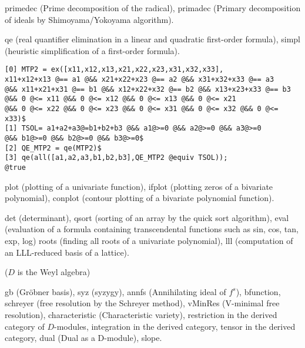 \medbreak
\noindent
{}

\noindent
{primedec} (Prime decomposition of the radical),
{primadec} (Primary decomposition of ideals by Shimoyama/Yokoyama algorithm).

\medbreak
\noindent
{}

\noindent
{qe} (real quantifier elimination in a linear and
quadratic first-order formula),
{simpl} (heuristic simplification of a first-order formula).

{\scriptsize
\begin{verbatim}
[0] MTP2 = ex([x11,x12,x13,x21,x22,x23,x31,x32,x33],
x11+x12+x13 @== a1 @&& x21+x22+x23 @== a2 @&& x31+x32+x33 @== a3
@&& x11+x21+x31 @== b1 @&& x12+x22+x32 @== b2 @&& x13+x23+x33 @== b3
@&& 0 @<= x11 @&& 0 @<= x12 @&& 0 @<= x13 @&& 0 @<= x21
@&& 0 @<= x22 @&& 0 @<= x23 @&& 0 @<= x31 @&& 0 @<= x32 @&& 0 @<= x33)$
[1] TSOL= a1+a2+a3@=b1+b2+b3 @&& a1@>=0 @&& a2@>=0 @&& a3@>=0
@&& b1@>=0 @&& b2@>=0 @&& b3@>=0$
[2] QE_MTP2 = qe(MTP2)$
[3] qe(all([a1,a2,a3,b1,b2,b3],QE_MTP2 @equiv TSOL));
@true
\end{verbatim}}

\medbreak
\noindent
{}

\noindent
{plot} (plotting of a univariate function),
{ifplot} (plotting zeros of a bivariate polynomial),
{conplot} (contour plotting of a bivariate polynomial function).

\medbreak
\noindent
{}

\noindent
{det} (determinant),
{qsort} (sorting of an array by the quick sort algorithm),
{eval} (evaluation of a formula containing transcendental functions
such as
{sin}, {cos}, {tan}, {exp},
{log})
{roots} (finding all roots of a univariate polynomial),
{lll} (computation of an LLL-reduced basis of a lattice).

\medbreak
\noindent
{} ($D$ is the Weyl algebra)

\noindent
{gb } (Gr\"obner basis),
{syz} (syzygy),
{annfs} (Annihilating ideal of $f^s$),
{bfunction},
{schreyer} (free resolution by the Schreyer method),
{vMinRes} (V-minimal free resolution),
{characteristic} (Characteristic variety),
{restriction} in the derived category of $D$-modules,
{integration} in the derived category,
{tensor}  in the derived category,
{dual} (Dual as a D-module),
{slope}.

\medbreak
\noindent
{}

